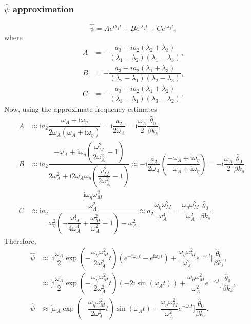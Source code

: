 \documentclass[12pt,psfig]{article}
\begin{document}
\subsubsection{$\hat{\psi}$ approximation}
$$\hat{\psi}=Ae^{\mathrm{i}\lambda_1 t}+Be^{\mathrm{i}\lambda_2 t}+Ce^{\mathrm{i}\lambda_3 t},$$ where
\begin{align*}
A&=-\dfrac{a_3-i a_2 (\lambda_2+ \lambda_3)}{(\lambda_1-\lambda_2) (\lambda_1-\lambda_3)},\\
B&=-\dfrac{a_3-i a_2 (\lambda_1+ \lambda_3)}{(\lambda_2-\lambda_1) (\lambda_2-\lambda_3)},\\
C&=-\dfrac{a_3-i a_2 (\lambda_1+ \lambda_2)}{(\lambda_3-\lambda_1) (\lambda_3-\lambda_2)}.
\end{align*}
Now, using the approximate frequency estimates
\begin{align*}
A&\approx \mathrm{i}a_2\dfrac{\omega_A+\mathrm{i}\omega_\eta }{2 \omega_A( \omega_A+\mathrm{i} \omega_\eta )}=\mathrm{i}\dfrac{a_2}{2 \omega_A}=\mathrm{i}\dfrac{\omega_A}{2 }\dfrac{\hat{\theta}_0}{\beta k_s},\\
B&\approx \mathrm{i}a_2\dfrac{-\omega_A+\mathrm{i}\omega_\eta \left(\dfrac{ \omega_M^2}{2 \omega_A^2}+1\right)}{2 \omega_A^2+\mathrm{i}2 \omega_A \omega_\eta \left(\dfrac{\omega_M^2}{2 \omega_A^2}-1\right)}\approx -\mathrm{i}\dfrac{a_2}{2\omega_A}\left(\dfrac{-\omega_A+\mathrm{i}\omega_\eta }{-\omega_A+\mathrm{i} \omega_\eta }\right)=-\mathrm{i}\dfrac{\omega_A}{2}\dfrac{\hat{\theta}_0}{\beta k_s},\\
C&\approx \mathrm{i}a_2\dfrac{\dfrac{\mathrm{i} \omega_\eta \omega_M^2}{\omega_A^2}}{\omega_\eta^2 \left(-\dfrac{\omega_M^4}{4 \omega_A^4}+\dfrac{\omega_M^2}{\omega_A^2}-1\right)-\omega_A^2}\approx a_2\dfrac{ \omega_\eta \omega_M^2}{\omega_A^4}=\dfrac{ \omega_\eta \omega_M^2}{\omega_A^2}\dfrac{\hat{\theta}_0}{\beta k_s}
\end{align*}
Therefore,
\begin{align*}
\hat{\psi}&\approx \Biggl[\mathrm{i}\dfrac{\omega_A}{2} \exp\left(-\dfrac{\omega_\eta\omega_M^2}{2\omega_A^2}t\right)\left(e^{-\mathrm{i}\omega_A t}-e^{\mathrm{i}\omega_A t}\right)+\dfrac{\omega_\eta\omega_M^2}{\omega_A^2}e^{-\omega_\eta t}\Biggr]\dfrac{\hat{\theta}_0}{\beta k_s},\\
&\approx \Biggl[\mathrm{i}\dfrac{\omega_A}{2} \exp\left(-\dfrac{\omega_\eta\omega_M^2}{2\omega_A^2}t\right)\left(-2\mathrm{i}\sin(\omega_A t)\right)+\dfrac{\omega_\eta\omega_M^2}{\omega_A^2}e^{-\omega_\eta t}\Biggr]\dfrac{\hat{\theta}_0}{\beta k_s},\\
\hat{\psi}&\approx \Biggl[\omega_A \exp\left(-\dfrac{\omega_\eta\omega_M^2}{2\omega_A^2}t\right)\sin(\omega_A t)+\dfrac{\omega_\eta\omega_M^2}{\omega_A^2}e^{-\omega_\eta t}\Biggr]\dfrac{\hat{\theta}_0}{\beta k_s}.
\end{align*}
\end{document}
